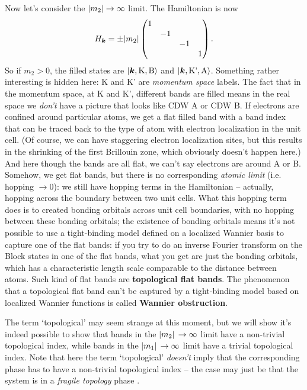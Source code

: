 \documentclass[hyperref, a4paper]{article}
\newcommand*{\concept}[1]{{\textbf{#1}}}
\begin{document}
Now let's consider the $\abs{m_2} \to \infty$ limit.
The Hamiltonian is now 
\begin{equation}
    H_{\vb*{k}} = \pm \abs{m_2} \pmqty{\dmat{1, -1, -1, 1}}.
\end{equation}
So if $m_2 > 0$, the filled states are $\ket{\vb*{k}, \text{K}, \text{B}}$
and $\ket{\vb*{k}, \text{K'}, \text{A}}$.
Something rather interesting is hidden here:
K and K' are \emph{momentum space} labels.
The fact that in the momentum space,
at K and K',
different bands are filled 
means in the real space we \emph{don't} have a picture that looks like CDW A or CDW B.
If electrons are confined around particular atoms,
we get a flat filled band
with a band index that can be traced back to the type of atom with electron localization in the unit cell.
(Of course, we can have staggering electron localization sites,
but this results in the shrinking of the first Brillouin zone,
which obviously doesn't happen here.)
And here though the bands are all flat,
we can't say electrons are around A or B.
Somehow, we get flat bands,
but there is no corresponding \emph{atomic limit} (i.e. hopping $\to 0$):
we still have hopping terms in the Hamiltonian -- 
actually, hopping across the boundary between two unit cells.
What this hopping term does is to created bonding orbitals 
across unit cell boundaries, 
with no hopping between these bonding orbitals;
the existence of bonding orbitals 
means it's not possible to use a tight-binding model 
defined on a localized Wannier basis 
to capture one of the flat bands:
if you try to do an inverse Fourier transform 
on the Block states in one of the flat bands, 
what you get are just the bonding orbitals, 
which has a characteristic length scale comparable 
to the distance between atoms.
Such kind of flat bands are \concept{topological flat bands}.
The phenomenon that a topological flat band can't be captured by 
a tight-binding model based on localized Wannier functions 
is called \concept{Wannier obstruction}.

The term `topological' may seem strange at this moment, 
but we will show it's indeed possible to 
show that bands in the $\abs*{m_2} \to \infty$ limit 
have a non-trivial topological index, 
while bands in the $\abs*{m_1} \to \infty$ limit 
have a trivial topological index.
Note that here the term `topological' 
\emph{doesn't} imply that the corresponding phase 
has to have a non-trivial topological index
-- the case may just be that the system is in a \emph{fragile topology} phase
\cite{po_fragile_2018}.
\end{document}
